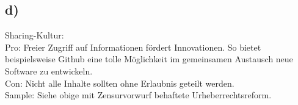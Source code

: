\documentclass{article}
\begin{document}
	\subsection*{d)}
	Sharing-Kultur: \\
	Pro: Freier Zugriff auf Informationen fördert Innovationen. So bietet beispielsweise Github eine tolle Möglichkeit im gemeinsamen Austausch neue Software zu entwickeln. \\
	Con: Nicht alle Inhalte sollten ohne Erlaubnis geteilt werden. \\
	Sample: Siehe obige mit Zensurvorwurf behaftete Urheberrechtsreform. \\
\end{document}

